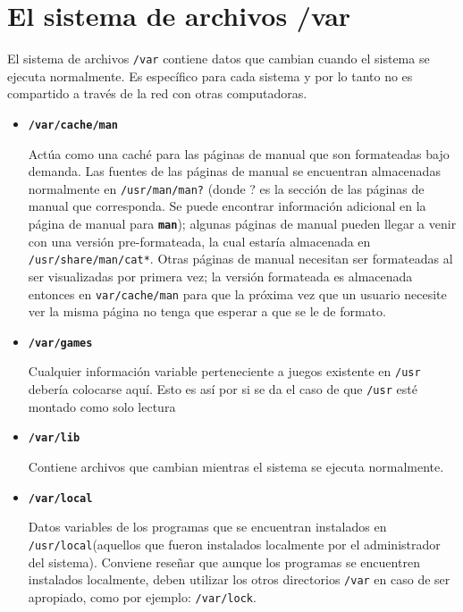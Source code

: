 \section{ El sistema de archivos /var}
    
    El sistema de archivos \texttt{/var} contiene datos que
    cambian cuando el sistema se ejecuta normalmente. Es específico para cada
    sistema y por lo tanto no es compartido a través de la red con otras
    computadoras. 

	\begin{itemize}  

	\item 
        
	\textbf{\texttt{/var/cache/man}} 
        
	 Actúa como una caché para las páginas de manual que son
	formateadas bajo demanda. Las fuentes de las páginas de manual se
	encuentran almacenadas normalmente en \texttt{/usr/man/man?}
	(donde ? es la sección de las páginas de manual que corresponda. Se
	puede 	encontrar información adicional en la página de manual para
	\texttt{\textbf{man}}); algunas páginas de manual
	pueden 	llegar a venir con una versión pre-formateada, la cual estaría
	almacenada 	en \texttt{/usr/share/man/cat*}. Otras
	páginas de manual necesitan ser formateadas al ser visualizadas por
	primera vez; la versión formateada es almacenada entonces en
	\texttt{var/cache/man} para que la próxima vez que un
	usuario necesite ver la misma página no tenga que esperar a que se le de
	formato.  

	\item 
        
	\textbf{\texttt{/var/games}} 
        
	 Cualquier información variable perteneciente a juegos
	existente en \texttt{/usr} debería colocarse aquí. Esto es
	así por si se da el caso de que \texttt{/usr} esté montado
	como 		solo lectura 

	\item 

	\textbf{\texttt{/var/lib}} 
    
	 Contiene archivos que cambian mientras el sistema se
	ejecuta normalmente. 

	\item 
        

	\textbf{\texttt{/var/local}} 
        
	 Datos variables de los programas que se encuentran
	instalados en \texttt{/usr/local}(aquellos que fueron
	instalados localmente por el administrador del sistema). Conviene
	reseñar  		que aunque los programas se encuentren
	instalados localmente, deben 			utilizar los otros
	directorios \texttt{/var} en caso de ser
	apropiado, como por ejemplo:
	\texttt{/var/lock}.  


\end{itemize}
